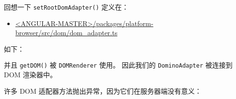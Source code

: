 
回想一下 \texttt{setRootDomAdapter()} 定义在：

\begin{itemize}
  \item \href{https://github.com/angular/angular/blob/master/packages/platform-browser/src/dom/dom_adapter.ts}
        {<ANGULAR-MASTER>/packages/platform-browser/src/dom/dom\_adapter.ts}
\end{itemize}


如下：




并且 \texttt{getDOM()} 被 \texttt{DOMRenderer} 使用。
因此我们的 \texttt{DominoAdapter} 被连接到 DOM 渲染器中。


许多 DOM 适配器方法抛出异常，因为它们在服务器端没有意义：


